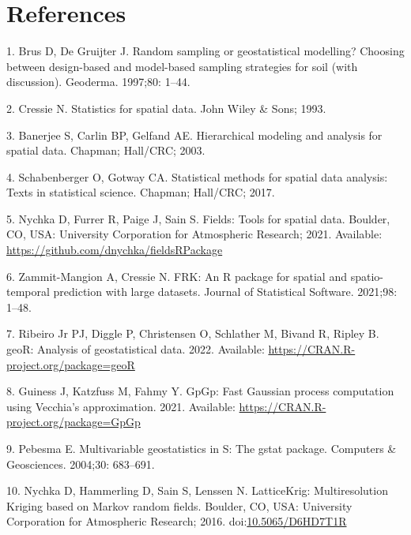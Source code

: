 \documentclass[10pt,letterpaper]{article}
\begin{document}
\hypertarget{references}{%
\section*{References}\label{references}}

\hypertarget{refs}{}
\leavevmode\hypertarget{ref-brus1997random}{}%
1. Brus D, De Gruijter J. Random sampling or geostatistical modelling?
Choosing between design-based and model-based sampling strategies for
soil (with discussion). Geoderma. 1997;80: 1--44.

\leavevmode\hypertarget{ref-cressie1993statistics}{}%
2. Cressie N. Statistics for spatial data. John Wiley \& Sons; 1993.

\leavevmode\hypertarget{ref-banerjee2003hierarchical}{}%
3. Banerjee S, Carlin BP, Gelfand AE. Hierarchical modeling and analysis
for spatial data. Chapman; Hall/CRC; 2003.

\leavevmode\hypertarget{ref-schabenberger2017statistical}{}%
4. Schabenberger O, Gotway CA. Statistical methods for spatial data
analysis: Texts in statistical science. Chapman; Hall/CRC; 2017.

\leavevmode\hypertarget{ref-nychka2021fields}{}%
5. Nychka D, Furrer R, Paige J, Sain S. Fields: Tools for spatial data.
Boulder, CO, USA: University Corporation for Atmospheric Research; 2021.
Available: \url{https://github.com/dnychka/fieldsRPackage}

\leavevmode\hypertarget{ref-zammitmangion2021FRK}{}%
6. Zammit-Mangion A, Cressie N. FRK: An R package for spatial and
spatio-temporal prediction with large datasets. Journal of Statistical
Software. 2021;98: 1--48.

\leavevmode\hypertarget{ref-ribiero2022geoR}{}%
7. Ribeiro Jr PJ, Diggle P, Christensen O, Schlather M, Bivand R, Ripley
B. geoR: Analysis of geostatistical data. 2022. Available:
\url{https://CRAN.R-project.org/package=geoR}

\leavevmode\hypertarget{ref-guiness2021gpgp}{}%
8. Guiness J, Katzfuss M, Fahmy Y. GpGp: Fast Gaussian process
computation using Vecchia's approximation. 2021. Available:
\url{https://CRAN.R-project.org/package=GpGp}

\leavevmode\hypertarget{ref-pebesma2004gstat}{}%
9. Pebesma E. Multivariable geostatistics in S: The gstat package.
Computers \& Geosciences. 2004;30: 683--691.

\leavevmode\hypertarget{ref-nychka2016latticekrig}{}%
10. Nychka D, Hammerling D, Sain S, Lenssen N. LatticeKrig:
Multiresolution Kriging based on Markov random fields. Boulder, CO, USA:
University Corporation for Atmospheric Research; 2016.
doi:\href{https://doi.org/10.5065/D6HD7T1R}{10.5065/D6HD7T1R}
\end{document}

